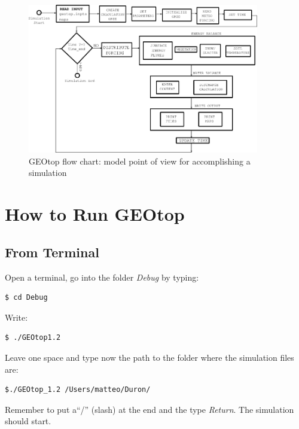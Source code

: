 \begin{figure}[t]
\centering
\includegraphics[width=0.9\textwidth]{./images/pic_flowchart/SCHEMAii.png}
\caption{GEOtop flow chart: model point of view for accomplishing a simulation}
\label{Fig_sim_flowchart2}
\end{figure}


\newpage
\section{How to Run GEOtop}
\subsection{From Terminal}

\noindent Open a terminal, go into the folder \textsl{Debug} by typing:

\footnotesize{
\begin{verbatim}
$ cd Debug
\end{verbatim}
}

\noindent Write:

\footnotesize{
\begin{verbatim}
$ ./GEOtop1.2 
\end{verbatim}
}

\noindent Leave one space and type now the path to the folder where the simulation files are:

\footnotesize{
\begin{verbatim}
$./GEOtop_1.2 /Users/matteo/Duron/
\end{verbatim}
}

\noindent Remember to put a``/'' (slash) at the end and the type {\it Return}. The simulation should start.


